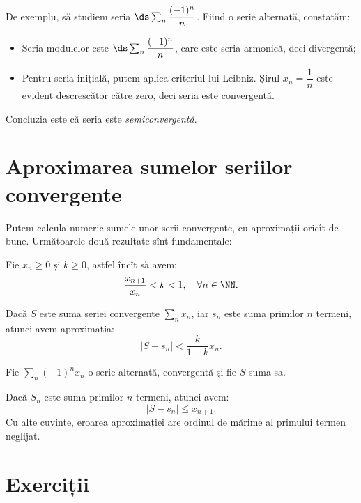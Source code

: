 De exemplu, să studiem seria $ \ds\sum_n \dfrac{(-1)^n}{n} $. Fiind o serie
alternată, constatăm:
\begin{itemize}
\item Seria modulelor este $ \ds\sum_n \dfrac{(-1)^n}{n} $, care este seria
  armonică, deci divergentă;
\item Pentru seria inițială, putem aplica criteriul lui Leibniz. Șirul $ x_n = \dfrac{1}{n} $
  este evident descrescător către zero, deci seria este convergentă.
\end{itemize}

Concluzia este că seria este \emph{semiconvergentă}.


\section{Aproximarea sumelor seriilor convergente}

Putem calcula numeric sumele unor serii convergente, cu aproximații oricît de bune.
Următoarele două rezultate sînt fundamentale:

\begin{theorem}\label{thm:aprox-poz}
  Fie $ x_n \geq 0 $ și $ k \geq 0 $, astfel încît să avem:
  \[
    \dfrac{x_{n+1}}{x_n} < k < 1, \quad \forall n \in \NN.
  \]

  Dacă $ S $ este suma seriei convergente $ \sum_n x_n $, iar $ s_n $ este suma
  primilor $ n $ termeni, atunci avem aproximația:
  \[
    |S - s_n| < \dfrac{k}{1 - k} x_n.
  \]
\end{theorem}

\begin{theorem}\label{thm:aprox-alt}
  Fie $ \sum_n (-1)^n x_n $ o serie alternată, convergentă și fie $ S $ suma sa.

  Dacă $ S_n $ este suma primilor $ n $ termeni, atunci avem:
  \[
    | S - s_n | \leq x_{n + 1}.
  \]
  Cu alte cuvinte, eroarea aproximației are ordinul de mărime al primului
  termen neglijat.
\end{theorem}


\section{Exerciții}

